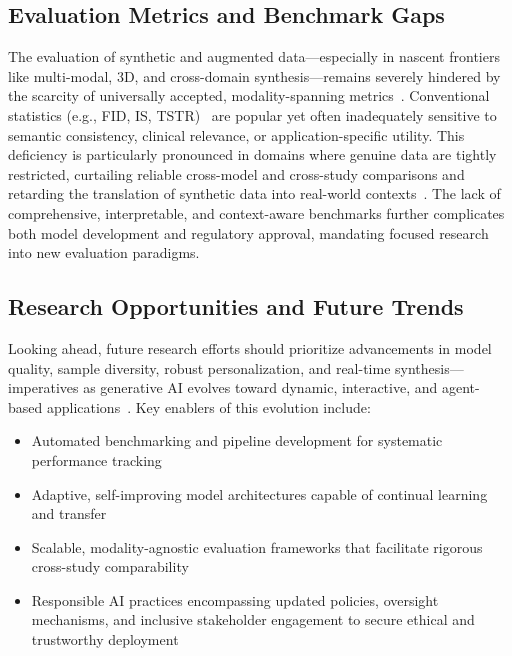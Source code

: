 \documentclass[sigconf]{acmart}
\begin{document}
\subsection{Evaluation Metrics and Benchmark Gaps}

The evaluation of synthetic and augmented data—especially in nascent frontiers like multi-modal, 3D, and cross-domain synthesis—remains severely hindered by the scarcity of universally accepted, modality-spanning metrics~\cite{ref35,ref52,ref53,ref81,ref89,ref91}. Conventional statistics (e.g., FID, IS, TSTR)~\cite{ref35,ref52,ref53} are popular yet often inadequately sensitive to semantic consistency, clinical relevance, or application-specific utility. This deficiency is particularly pronounced in domains where genuine data are tightly restricted, curtailing reliable cross-model and cross-study comparisons and retarding the translation of synthetic data into real-world contexts~\cite{ref81,ref89,ref91}. The lack of comprehensive, interpretable, and context-aware benchmarks further complicates both model development and regulatory approval, mandating focused research into new evaluation paradigms.

\subsection{Research Opportunities and Future Trends}

Looking ahead, future research efforts should prioritize advancements in model quality, sample diversity, robust personalization, and real-time synthesis—imperatives as generative AI evolves toward dynamic, interactive, and agent-based applications~\cite{ref88,ref89,ref90,ref101,ref102}. Key enablers of this evolution include:

\begin{itemize}
    \item Automated benchmarking and pipeline development for systematic performance tracking~\cite{ref88,ref89}
    \item Adaptive, self-improving model architectures capable of continual learning and transfer
    \item Scalable, modality-agnostic evaluation frameworks that facilitate rigorous cross-study comparability
    \item Responsible AI practices encompassing updated policies, oversight mechanisms, and inclusive stakeholder engagement to secure ethical and trustworthy deployment~\cite{ref1,ref8,ref11,ref15,ref16,ref24,ref32,ref54,ref58,ref60,ref63,ref67,ref68,ref69,ref70,ref76,ref77,ref78,ref81,ref82,ref88,ref89}
\end{itemize}
\end{document}
